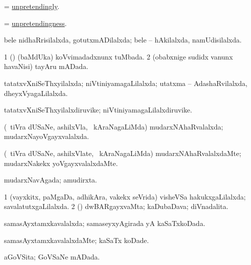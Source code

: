 \bentry
{} 
\gl{\kirxvi}
\expl{}
\bmng
= \hyperlink{unpretendingly}{unpretendingly}. 
\emng
\eentry

\bentry
{} 
\gl{\nA}
\expl{}
\bmng
= \hyperlink{unpretendingness}{unpretendingness}. 
\emng
\eentry

\bentry
{} 
\gl{\gu}
\expl{}
\bmng
bele nidhaRrisilalxda, gotutxmADilalxda; bele -- hAkilalxda, namUdisilalxda. 
\emng
\eentry

\bentry
{} 
\gl{\gu}
\expl{}
\bmng
\bnum
\num{1} (\ca) (baMdUka) koVvimadadxnunx tuMbada. 
\num{2} (obabxnige sudidx \mo vanunx havaNisi) tayAru mADada. 
\enum
\emng
\eentry

\bentry
{} 
\gl{\gu}
\expl{}
\bmng
tatatxvXniSeThxyilalxda; niVtiniyamagaLilalxda; utatxma -- AdashaRvilalxda, dheyxVyagaLilalxda. 
\emng
\eentry

\bentry
{} 
\gl{\nA}
\expl{}
\bmng
tatatxvXniSeThxyilalxdiruvike; niVtiniyamagaLilalxdiruvike. 
\emng
\eentry

\bentry
{} 
\gl{\gu}
\expl{}
\bmng
(\kanmu\ tiVra dUSaNe, ashilxVla, \mo\ kAraNagaLiMda) mudarxNAhaRvalalxda; mudarxNayoVgayxvalalxda. 
\emng
\eentry

\bentry
{} 
\gl{\kirxvi}
\expl{}
\bmng
(\kanmu\ tiVra dUSaNe, ashilxVlate, \mo\ kAraNagaLiMda) mudarxNAhaRvalalxdaMte; mudarxNakekx yoVgayxvalalxdaMte. 
\emng
\eentry

\bentry
{} 
\gl{\gu}
\expl{}
\bmng
mudarxNavAgada; amudirxta. 
\emng
\eentry

\bentry
{} 
\gl{\gu}
\expl{}
\bmng
\bnum
\num{1} (vayxkitx, paMgaDa, adhikAra, \mo vakekx seVrida) visheVSa hakukxgaLilalxda; savalatutxgaLilalxda. 
\num{2} (\ame) dwBARgayxvaMta; kaDubaDava; diVnadalita. 
\enum
\emng
\eentry

\bentry
{} 
\gl{\gu}
\expl{}
\bmng
samasAyxtamxkavalalxda; samaseyxyAgirada yA kaSaTxkoDada. 
\emng
\eentry

\bentry
{} 
\gl{\kirxvi}
\expl{}
\bmng
samasAyxtamxkavalalxdaMte; kaSaTx koDade. 
\emng
\eentry

\bentry
{} 
\gl{\gu}
\expl{}
\bmng
aGoVSita; GoVSaNe mADada. 
\emng
\eentry


